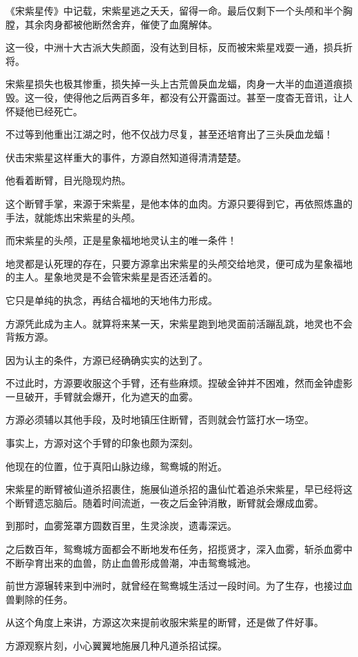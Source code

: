 \begin{this_body}
《宋紫星传》中记载，宋紫星逃之夭夭，留得一命。最后仅剩下一个头颅和半个胸膛，其余肉身都被他断然舍弃，催使了血魔解体。

这一役，中洲十大古派大失颜面，没有达到目标，反而被宋紫星戏耍一通，损兵折将。

宋紫星损失也极其惨重，损失掉一头上古荒兽戾血龙蝠，肉身一大半的血道道痕损毁。这一役，使得他之后两百多年，都没有公开露面过。甚至一度杳无音讯，让人怀疑他已经死亡。

不过等到他重出江湖之时，他不仅战力尽复，甚至还培育出了三头戾血龙蝠！

伏击宋紫星这样重大的事件，方源自然知道得清清楚楚。

他看着断臂，目光隐现灼热。

这个断臂手掌，来源于宋紫星，是他本体的血肉。方源只要得到它，再依照炼蛊的手法，就能炼出宋紫星的头颅。

而宋紫星的头颅，正是星象福地地灵认主的唯一条件！

地灵都是认死理的存在，只要方源拿出宋紫星的头颅交给地灵，便可成为星象福地的主人。星象地灵是不会管宋紫星是否还活着的。

它只是单纯的执念，再结合福地的天地伟力形成。

方源凭此成为主人。就算将来某一天，宋紫星跑到地灵面前活蹦乱跳，地灵也不会背叛方源。

因为认主的条件，方源已经确确实实的达到了。

不过此时，方源要收服这个手臂，还有些麻烦。捏破金钟并不困难，然而金钟虚影一旦破开，手臂就会爆开，化为遮天的血雾。

方源必须辅以其他手段，及时地镇压住断臂，否则就会竹篮打水一场空。

事实上，方源对这个手臂的印象也颇为深刻。

他现在的位置，位于真阳山脉边缘，鸳鸯城的附近。

宋紫星的断臂被仙道杀招裹住，施展仙道杀招的蛊仙忙着追杀宋紫星，早已经将这个断臂遗忘脑后。随着时间流逝，一夜之后金钟消散，断臂就会爆成血雾。

到那时，血雾笼罩方圆数百里，生灵涂炭，遗毒深远。

之后数百年，鸳鸯城方面都会不断地发布任务，招揽贤才，深入血雾，斩杀血雾中不断孕育出来的血兽，防止血兽形成兽潮，冲击鸳鸯城池。

前世方源辗转来到中洲时，就曾经在鸳鸯城生活过一段时间。为了生存，也接过血兽剿除的任务。

从这个角度上来讲，方源这次来提前收服宋紫星的断臂，还是做了件好事。

方源观察片刻，小心翼翼地施展几种凡道杀招试探。


\end{this_body}
